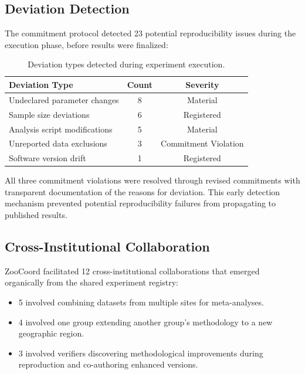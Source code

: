 \documentclass[11pt,a4paper]{article}
\begin{document}
\subsection{Deviation Detection}

The commitment protocol detected 23 potential reproducibility issues during the execution phase, before results were finalized:

\begin{table}[H]
\centering
\caption{Deviation types detected during experiment execution.}
\label{tab:deviations}
\begin{tabular}{@{}lcc@{}}
\toprule
\textbf{Deviation Type} & \textbf{Count} & \textbf{Severity} \\
\midrule
Undeclared parameter changes & 8 & Material \\
Sample size deviations & 6 & Registered \\
Analysis script modifications & 5 & Material \\
Unreported data exclusions & 3 & Commitment Violation \\
Software version drift & 1 & Registered \\
\bottomrule
\end{tabular}
\end{table}

All three commitment violations were resolved through revised commitments with transparent documentation of the reasons for deviation.
This early detection mechanism prevented potential reproducibility failures from propagating to published results.

\subsection{Cross-Institutional Collaboration}

ZooCoord facilitated 12 cross-institutional collaborations that emerged organically from the shared experiment registry:

\begin{itemize}[leftmargin=*]
    \item 5 involved combining datasets from multiple sites for meta-analyses.
    \item 4 involved one group extending another group's methodology to a new geographic region.
    \item 3 involved verifiers discovering methodological improvements during reproduction and co-authoring enhanced versions.
\end{itemize}
\end{document}
